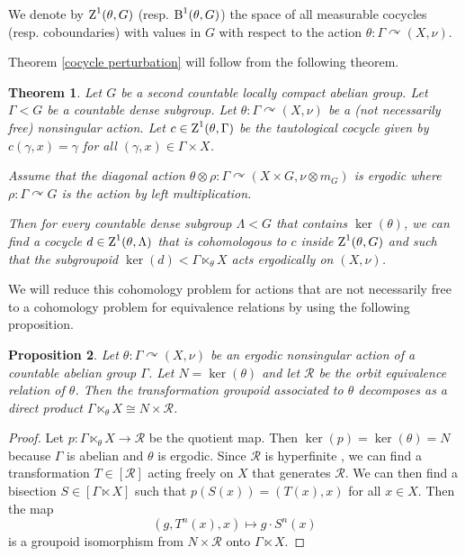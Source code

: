 \documentclass[a4paper,11pt]{amsart}
\numberwithin{equation}{section}
\newtheorem{theorem}{Theorem}[section]
\newtheorem{proposition}[theorem]{Proposition}
\theoremstyle{definition}
\newcommand{\rB}{\mathord{\text{\rm B}}}
\newcommand{\rZ}{\mathord{\text{\rm Z}}}
\newcommand{\cR}{\mathcal{R}}
\begin{document}
We denote by $\rZ^1(\theta, G)$ (resp.\! $\rB^1(\theta, G)$) the space of all measurable cocycles (resp.\! coboundaries) with values in $G$ with respect to the action $\theta : \Gamma \curvearrowright (X, \nu)$. 


Theorem \ref{cocycle perturbation} will follow from the following theorem.

\begin{theorem}  \label{ergodic kernel dense subgroup for non free actions}
Let $G$ be a second countable locally compact abelian group. Let $\Gamma < G$ be a countable dense subgroup. Let $\theta : \Gamma \curvearrowright (X,\nu)$ be a (not necessarily free) nonsingular action. Let $c \in \rZ^1(\theta,\Gamma)$ be the tautological cocycle given by $c(\gamma,x)=\gamma$ for all $(\gamma,x) \in \Gamma \times X$.

Assume that the diagonal action $\theta \otimes \rho : \Gamma \curvearrowright (X \times G,\nu \otimes m_G)$ is ergodic where $\rho : \Gamma \curvearrowright G$ is the action by left multiplication. 

Then for every countable dense subgroup $\Lambda < G$ that contains $\ker(\theta)$, we can find a cocycle $d \in \rZ^1(\theta,\Lambda)$ that is cohomologous to $c$ inside $\rZ^1(\theta,G)$ and such that the subgroupoid $\ker(d) < \Gamma \ltimes_\theta X$ acts ergodically on $(X,\nu)$.
\end{theorem}

We will reduce this cohomology problem for actions that are not necessarily free to a cohomology problem for equivalence relations by using the following proposition.

\begin{proposition} \label{abelian groupoid}
    Let $\theta : \Gamma \curvearrowright (X,\nu)$ be an ergodic nonsingular action of a countable abelian group $\Gamma$. Let $N = \ker(\theta)$ and let $\cR$ be the orbit equivalence relation of $\theta$. Then the transformation groupoid associated to $\theta$ decomposes as a direct product $\Gamma \ltimes_\theta X \cong  N \times \cR$.
\end{proposition}
\begin{proof}
    Let $ p : \Gamma \ltimes_\theta X \rightarrow \cR$ be the quotient map. Then $\ker(p)=\ker(\theta) =N$ because $\Gamma$ is abelian and $\theta$ is ergodic. Since $\cR$ is hyperfinite \cite{CFW81}, we can find a transformation $T \in [\cR]$ acting freely on $X$ that generates $\cR$. We can then find a bisection $S \in [\Gamma \ltimes X]$ such that $p(S(x))=(T(x),x)$ for all $x \in X$. Then the map 
    $$(g, T^n(x),x) \mapsto g \cdot S^n(x)$$
    is a groupoid isomorphism from $N \times \cR$ onto $\Gamma \ltimes X$.
\end{proof}
\end{document}

